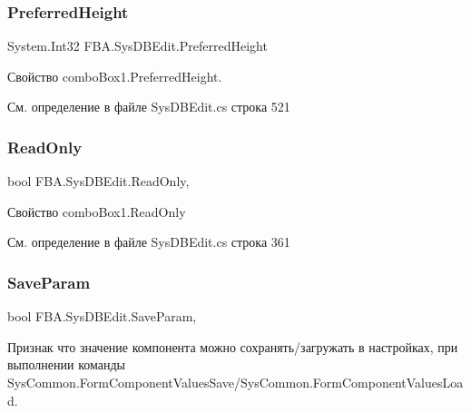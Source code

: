 \subsubsection{\texorpdfstring{Preferred\+Height}{PreferredHeight}}
{\footnotesize\ttfamily System.\+Int32 F\+B\+A.\+Sys\+D\+B\+Edit.\+Preferred\+Height\hspace{0.3cm}{\ttfamily [get]}}



Свойство combo\+Box1.\+Preferred\+Height. 



См. определение в файле Sys\+D\+B\+Edit.\+cs строка 521

\mbox{\label{class_f_b_a_1_1_sys_d_b_edit_a5144c4740f3a30ba8d3243bc533a968b}} 
\subsubsection{\texorpdfstring{Read\+Only}{ReadOnly}}
{\footnotesize\ttfamily bool F\+B\+A.\+Sys\+D\+B\+Edit.\+Read\+Only\hspace{0.3cm}{\ttfamily [get]}, {\ttfamily [set]}}



Свойство combo\+Box1.\+Read\+Only 



См. определение в файле Sys\+D\+B\+Edit.\+cs строка 361

\mbox{\label{class_f_b_a_1_1_sys_d_b_edit_af7bc6ecb90f3c91426bab85c7eeca4f4}} 
\subsubsection{\texorpdfstring{Save\+Param}{SaveParam}}
{\footnotesize\ttfamily bool F\+B\+A.\+Sys\+D\+B\+Edit.\+Save\+Param\hspace{0.3cm}{\ttfamily [get]}, {\ttfamily [set]}}



Признак что значение компонента можно сохранять/загружать в настройках, при выполнении команды Sys\+Common.\+Form\+Component\+Values\+Save/\+Sys\+Common.Form\+Component\+Values\+Load. 



